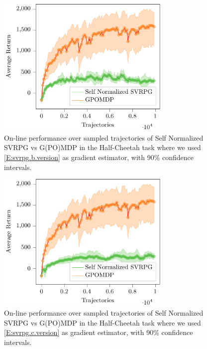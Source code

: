 \begin{figure}[h]
	\begin{minipage}[h]{1\textwidth}
		\centering
		\includegraphics[width=0.75\textwidth]{Images/Experiments/half_cheetah_GPOMDP_vs_SN_SVRPG_B.pdf}
		\vspace{-0.1in}
		\caption{On-line performance over sampled trajectories of Self Normalized \acs{SVRPG} vs G(PO)MDP in the Half-Cheetah task where we used \ref{E:svrpg.b.version} as gradient estimator, with 90\% confidence intervals.}
		\label{fig:hcfive}
	\end{minipage}
	\vspace{-0.15in}
\end{figure}
\begin{figure}[h]
	\begin{minipage}[h]{1\textwidth}
		\centering
		\includegraphics[width=0.75\textwidth]{Images/Experiments/half_cheetah_GPOMDP_vs_SN_SVRPG_C.pdf}
		\vspace{-0.1in}
		\caption{On-line performance over sampled trajectories of Self Normalized \acs{SVRPG} vs G(PO)MDP in the Half-Cheetah task where we used \ref{E:svrpg.c.version} as gradient estimator, with 90\% confidence intervals.}
		\label{fig:hcsix}
	\end{minipage}
	\vspace{-0.15in}
\end{figure}


